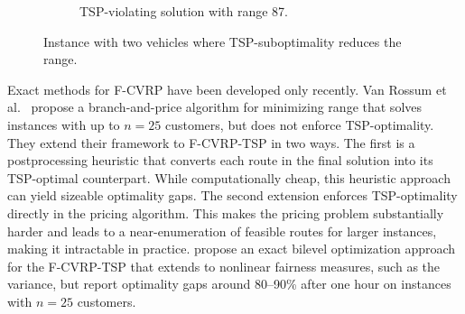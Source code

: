 \documentclass[a4paper,fleqn]{cas-dc}%
\newcommand{\CitetVR}[1]{Van Rossum et al.\ \cite{#1}}
\begin{document}
\begin{figure}[htb!]
\begin{subfigure}[t]{0.48\textwidth}
\caption{TSP-violating solution with range 87.}
\end{subfigure}
\caption{Instance with two vehicles where TSP-suboptimality reduces the range.}
\label{fig:tsp_suboptimality}
\end{figure}

Exact methods for F-CVRP have been developed only recently. \CitetVR{rossum2025efficient} propose a branch-and-price algorithm for minimizing range that solves instances with up to $n = 25$ customers, but does not enforce TSP-optimality. They extend their framework to F-CVRP-TSP in two ways. The first is a postprocessing heuristic that converts each route in the final solution into its TSP-optimal counterpart. While computationally cheap, this heuristic approach can yield sizeable optimality gaps. The second extension enforces TSP-optimality directly in the pricing algorithm. This makes the pricing problem substantially harder and leads to a near-enumeration of feasible routes for larger instances, making it intractable in practice. \citet{ljubic2026fairvehicle} propose an exact bilevel optimization approach for the F-CVRP-TSP that extends to nonlinear fairness measures, such as the variance, but report optimality gaps around 80--90\% after one hour on instances with $n =25$ customers.
\end{document}
